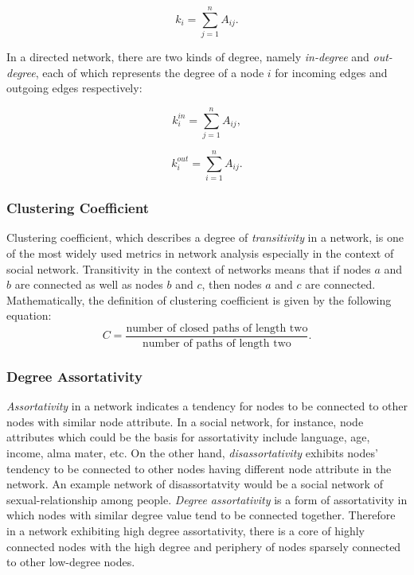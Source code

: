 \documentclass{article}
\begin{document}
	\begin{equation}
 	 k_i = \sum_{j = 1}^n A_{ij}.
	\end{equation}
	
	In a directed network, there are two kinds of degree, namely \textit{in-degree} and \textit{out-degree}, each of which represents the degree of a node $i$ for incoming edges and outgoing edges respectively:
	
	\begin{equation}
 	 k_i^{in} = \sum_{j = 1}^n A_{ij},
	\end{equation}
	
	\begin{equation}
 	 k_i^{out} = \sum_{i = 1}^n A_{ij}.
	\end{equation}

	
	\subsubsection{Clustering Coefficient}
	Clustering coefficient, which describes a degree of \textit{transitivity} in a network, is one of the most widely used metrics in network analysis especially in the context of social network. Transitivity in the context of networks means that if nodes $a$ and $b$ are connected as well as nodes $b$ and $c$, then nodes $a$ and $c$ are connected. Mathematically, the definition of clustering coefficient is given by the following equation:
	\begin{equation}
	C = \frac{\text{number of closed paths of length two}}{\text{number of paths of length two}}.
	\end{equation}
	
	\subsubsection{Degree Assortativity}
	\textit{Assortativity} in a network indicates a tendency for nodes to be connected to other nodes with similar node attribute. In a social network, for instance, node attributes which could be the basis for assortativity include language, age, income, alma mater, etc. On the other hand, \textit{disassortativity} exhibits nodes' tendency to be connected to other nodes having different node attribute in the network. An example network of disassortatvity would be a social network of sexual-relationship among people. 
	\textit{Degree assortativity} is a form of assortativity in which nodes with similar degree value tend to be connected together. Therefore in a network exhibiting high degree assortativity, there is a core of highly connected nodes with the high degree and periphery of nodes sparsely connected to other low-degree nodes.
	
\end{document}
